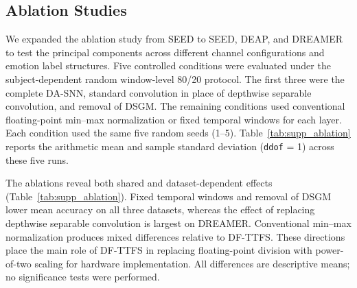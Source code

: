 ﻿\documentclass[12pt]{article}
\begin{document}
\subsection{Ablation Studies}

We expanded the ablation study from SEED to SEED, DEAP, and DREAMER to test the principal components across different channel configurations and emotion label structures. Five controlled conditions were evaluated under the subject-dependent random window-level 80/20 protocol. The first three were the complete DA-SNN, standard convolution in place of depthwise separable convolution, and removal of DSGM. The remaining conditions used conventional floating-point min--max normalization or fixed temporal windows for each layer. Each condition used the same five random seeds (1--5). Table~\ref{tab:supp_ablation} reports the arithmetic mean and sample standard deviation (\texttt{ddof} = 1) across these five runs.

The ablations reveal both shared and dataset-dependent effects (Table~\ref{tab:supp_ablation}). Fixed temporal windows and removal of DSGM lower mean accuracy on all three datasets, whereas the effect of replacing depthwise separable convolution is largest on DREAMER. Conventional min--max normalization produces mixed differences relative to DF-TTFS. These directions place the main role of DF-TTFS in replacing floating-point division with power-of-two scaling for hardware implementation. All differences are descriptive means; no significance tests were performed.
\end{document}
